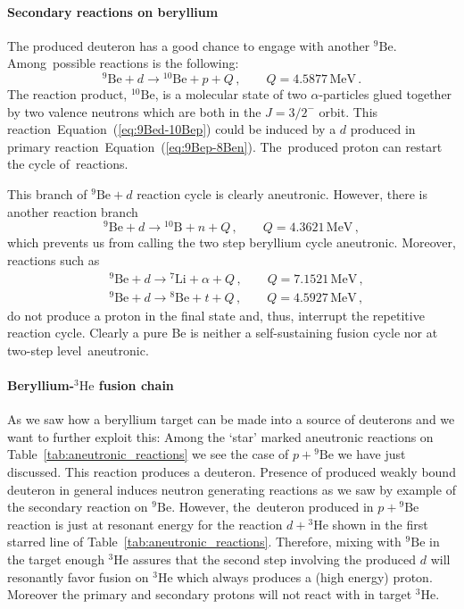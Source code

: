 \documentclass[particles,article,accept,pdftex,moreauthors]{Definitions/mdpi}
\begin{document}
\vspace{-6pt}\paragraph*{\bf Secondary reactions on beryllium}
The produced deuteron has a good chance to engage with another ${}^9\mathrm{Be}$. Among~possible reactions is the following:
\begin{equation}
{}^9\mathrm{Be}+d\to\! ^{10}\mathrm{Be}+p + Q \,,\qquad Q= 4.5877\,\mathrm{MeV}\,.
\label{eq:9Bed-10Bep}
\end{equation}
The reaction product, ${}^{10}\mathrm{Be}$,
is a molecular state of two $\alpha$-particles glued together by two valence neutrons which are both in the $J=3/2^-$ orbit. This reaction~Equation~(\ref{eq:9Bed-10Bep}) could be induced by a $d$ produced in primary reaction~Equation~(\ref{eq:9Bep-8Ben}). The~produced proton can restart the cycle of~reactions. 

This branch of ${}^9\mathrm{Be}+d$ reaction cycle is clearly aneutronic. However, there is another reaction branch
\begin{equation}
{}^9\mathrm{Be}+d\to\! ^{10}\mathrm{B}+n + Q \,,\qquad Q= 4.3621\,\mathrm{MeV}\,,
\label{eq:9Bed-10Bn}
\end{equation}
which prevents us from calling the two step beryllium cycle aneutronic. Moreover, reactions such as
\begin{align}
&{}^9\mathrm{Be}+d\to\! ^{7}\mathrm{Li}+\alpha + Q \,,\qquad Q= 7.1521\,\mathrm{MeV}\,,\\
&{}^9\mathrm{Be}+d\to\! ^{8}\mathrm{Be}+t + Q \,,\qquad Q= 4.5927\,\mathrm{MeV}\,,
\label{eq:9Bed-7Lia-8Bet}
\end{align}
do not produce a proton in the final state and, thus, interrupt the repetitive reaction cycle. Clearly a pure Be is neither a self-sustaining fusion cycle nor at two-step level~aneutronic.


\vspace{-6pt}\paragraph*{\bf Beryllium-${}^{3}\mathrm{He}$ fusion chain}
As we saw how a beryllium target can be made into a source of deuterons and we want to further exploit this: Among the `star' marked aneutronic reactions on Table~\ref{tab:aneutronic_reactions} we see the case of $p + {}^9\mathrm{Be}$ we have just discussed. This reaction produces a deuteron. Presence of produced weakly bound deuteron in general induces neutron generating reactions as we saw by example of the secondary reaction on ${}^9\mathrm{Be}$. However, the~deuteron produced in $p + {}^9\mathrm{Be}$ reaction is just at resonant energy for the reaction $d + {}^{3}\mathrm{He}$ shown in the first starred line of Table~\ref{tab:aneutronic_reactions}. Therefore, mixing with ${}^9\mathrm{Be}$ in the target enough ${}^{3}\mathrm{He}$ assures that the second step involving the produced $d$ will resonantly favor fusion on ${}^{3}\mathrm{He}$ which always produces a (high energy) proton. Moreover the primary and secondary protons will not react with in target ${}^{3}\mathrm{He}$.
\end{document}
